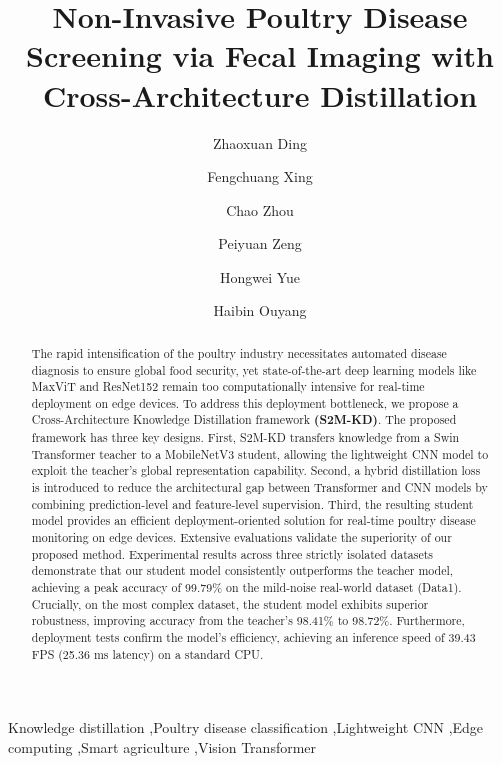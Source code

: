 \documentclass[review]{elsarticle}
\begin{document}
\begin{frontmatter}

\title{Non-Invasive Poultry Disease Screening via Fecal Imaging with Cross-Architecture Distillation}

\author[1]{Zhaoxuan Ding}
\author[1]{Fengchuang Xing}
\author[2]{Chao Zhou}
\author[1]{Peiyuan Zeng}
\author[1]{Hongwei Yue}
\author[3]{Haibin Ouyang}

\address[1]{School of Electronic and Information Engineering, Guangdong University of Education, Guangzhou, China}
\address[2]{School of Electronic Information, Huzhou College, Huzhou 313000, China}
\address[3]{School of Mechanical and Electric Engineering, Guangzhou University, Guangzhou 510006, China}


\begin{abstract}
The rapid intensification of the poultry industry necessitates automated disease diagnosis to ensure global food security, yet state-of-the-art deep learning models like MaxViT and ResNet152 remain too computationally intensive for real-time deployment on edge devices. 
To address this deployment bottleneck, we propose a Cross-Architecture Knowledge Distillation framework \textbf{(S2M-KD)}. 
The proposed framework has three key designs. First, S2M-KD transfers knowledge from a Swin Transformer teacher to a MobileNetV3 student, allowing the lightweight CNN model to exploit the teacher's global representation capability. Second, a hybrid distillation loss is introduced to reduce the architectural gap between Transformer and CNN models by combining prediction-level and feature-level supervision. Third, the resulting student model provides an efficient deployment-oriented solution for real-time poultry disease monitoring on edge devices.
Extensive evaluations validate the superiority of our proposed method. Experimental results across three strictly isolated datasets demonstrate that our student model consistently outperforms the teacher model, achieving a peak accuracy of 99.79\% on the mild-noise real-world dataset (Data1). Crucially, on the most complex dataset, the student model exhibits superior robustness, improving accuracy from the teacher's 98.41\% to 98.72\%. Furthermore, deployment tests confirm the model's efficiency, achieving an inference speed of 39.43 FPS (25.36 ms latency) on a standard CPU.
\end{abstract}

\begin{keyword}
Knowledge distillation \sep Poultry disease classification \sep Lightweight CNN \sep Edge computing \sep Smart agriculture \sep Vision Transformer
\end{keyword}

\end{frontmatter}
\end{document}
